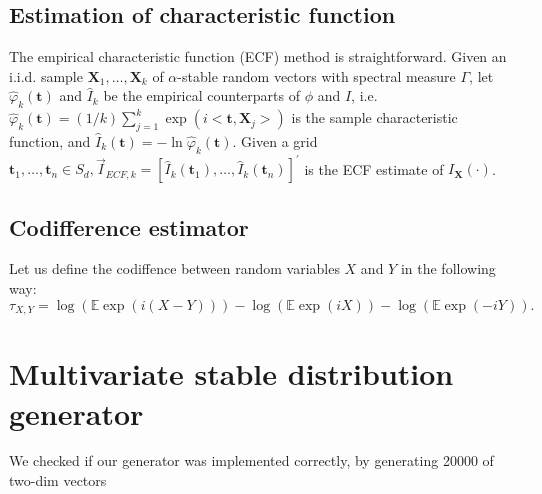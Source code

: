 \documentclass{article}
\begin{document}
	\subsection{Estimation of characteristic function} \label{teoCF}
	The empirical characteristic function (ECF) method is straightforward. Given an i.i.d. sample $\mathbf{X}_1, \ldots, \mathbf{X}_k$ of $\alpha$-stable random vectors with spectral measure $\Gamma$, let $\widehat{\varphi}_k(\mathbf{t})$ and $\widehat{I}_k$ be the empirical counterparts of $\phi$ and $I$, i.e. $\widehat{\varphi}_k(\mathbf{t})=(1 / k) \sum_{j=1}^k \exp \left(i<\mathbf{t}, \mathbf{X}_j>\right)$ is the sample characteristic function, and $\widehat{I}_k(\mathbf{t})=-\ln \widehat{\varphi}_k(\mathbf{t})$. Given a grid $\mathbf{t}_1, \ldots, \mathbf{t}_n \in S_d, \vec{I}_{E C F, k}=\left[\hat{I}_k\left(\mathbf{t}_1\right), \ldots, \hat{I}_k\left(\mathbf{t}_n\right)\right]^{\prime}$ is the ECF estimate of $I_{\mathbf{X}}(\cdot)$.
	
	\subsection{Codifference estimator}
	Let us define the codiffence between random variables $X$ and $Y$ in the following way:
	\begin{equation}
		\tau_{X, Y}=\log (\mathbb{E} \exp (i(X-Y)))-\log (\mathbb{E} \exp (i X))-\log (\mathbb{E} \exp (-i Y)).
	\end{equation}
	
	\newpage
	\section{Multivariate stable distribution generator}
	
	We checked if our generator was implemented correctly, by generating 20000 of two-dim vectors
	
\end{document}
